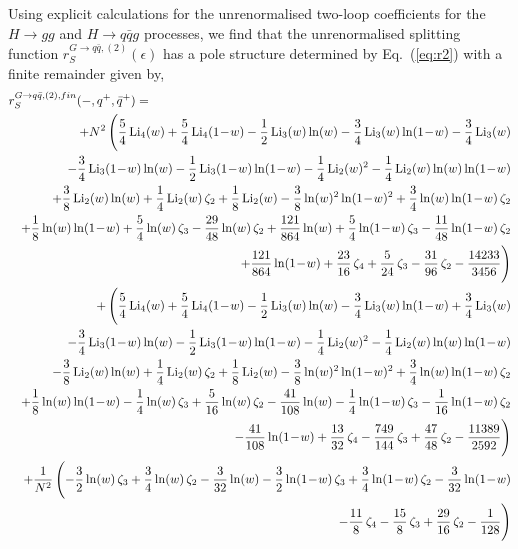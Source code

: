 \documentclass[paper,notoc,nohyper]{JHEP3}
\def\e{\epsilon}
\def\lx{\ln(w)}
\def\ly{\ln(1\!-\!w)}
\def\Libx{{\rm Li}_2(w)}
\def\Licx{{\rm Li}_3(w)}
\def\Lidx{{\rm Li}_4(w)}
\def\Licy{{\rm Li}_3(1\!-\!w)}
\def\Lidy{{\rm Li}_4(1\!-\!w)}
\def\e{\epsilon}
\begin{document}
Using explicit calculations for the unrenormalised two-loop coefficients for the $H \to gg$ and
$H \to q\bar q g$ processes, 
we find that the unrenormalised splitting function $r_{S}^{G \to q\bar q,(2)}(\e)$ has 
a pole structure determined by
Eq.~(\ref{eq:r2}) with a finite remainder given by,
\begin{eqnarray}
\label{eq:r2qqpp}
\lefteqn{r_{S}^{G \to q\bar q,(2),fin}(-,q^{+},\bar{q}^{+})=}\nonumber \\&&
+{N^2}\,\Biggl ({5\over 4}\,{\Lidx}+{5\over 4}\,{\Lidy}-{1\over 2}\,{\Licx}\,{\lx}-{3\over 4}\,{\Licx}\,{\ly}-{3\over 4}\,{\Licx}\nonumber \\&&
-{3\over 4}\,{\Licy}\,{\lx}-{1\over 2}\,{\Licy}\,{\ly}-{1\over 4}\,{\Libx^2}-{1\over 4}\,{\Libx}\,{\lx}\,{\ly}\nonumber \\&&
+{3\over 8}\,{\Libx}\,{\lx}+{1\over 4}\,{\Libx}\,{\zeta_2}+{1\over 8}\,{\Libx}-{3\over 8}\,{\lx^2}\,{\ly^2}+{3\over 4}\,{\lx}\,{\ly}\,{\zeta_2}\nonumber \\&&
+{1\over 8}\,{\lx}\,{\ly}+{5\over 4}\,{\lx}\,{\zeta_3}-{29\over 48}\,{\lx}\,{\zeta_2}+{121\over 864}\,{\lx}+{5\over 4}\,{\ly}\,{\zeta_3}-{11\over 48}\,{\ly}\,{\zeta_2}\nonumber \\&&
+{121\over 864}\,{\ly}+{23\over 16}\,{\zeta_4}+{5\over 24}\,{\zeta_3}-{31\over 96}\,{\zeta_2}-{14233\over 3456}\Biggr )\nonumber \\&&
+\,\Biggl ({5\over 4}\,{\Lidx}+{5\over 4}\,{\Lidy}-{1\over 2}\,{\Licx}\,{\lx}-{3\over 4}\,{\Licx}\,{\ly}+{3\over 4}\,{\Licx}\nonumber \\&&
-{3\over 4}\,{\Licy}\,{\lx}-{1\over 2}\,{\Licy}\,{\ly}-{1\over 4}\,{\Libx^2}-{1\over 4}\,{\Libx}\,{\lx}\,{\ly}\nonumber \\&&
-{3\over 8}\,{\Libx}\,{\lx}+{1\over 4}\,{\Libx}\,{\zeta_2}+{1\over 8}\,{\Libx}-{3\over 8}\,{\lx^2}\,{\ly^2}+{3\over 4}\,{\lx}\,{\ly}\,{\zeta_2}\nonumber \\&&
+{1\over 8}\,{\lx}\,{\ly}-{1\over 4}\,{\lx}\,{\zeta_3}+{5\over 16}\,{\lx}\,{\zeta_2}-{41\over 108}\,{\lx}-{1\over 4}\,{\ly}\,{\zeta_3}-{1\over 16}\,{\ly}\,{\zeta_2}\nonumber \\&&
-{41\over 108}\,{\ly}+{13\over 32}\,{\zeta_4}-{749\over 144}\,{\zeta_3}+{47\over 48}\,{\zeta_2}-{11389\over 2592}\Biggr)\nonumber \\&&
+{1\over N^2}\,\Biggl (-{3\over 2}\,{\lx}\,{\zeta_3}+{3\over 4}\,{\lx}\,{\zeta_2}-{3\over 32}\,{\lx}-{3\over 2}\,{\ly}\,{\zeta_3}+{3\over 4}\,{\ly}\,{\zeta_2}-{3\over 32}\,{\ly}\nonumber \\&&
-{11\over 8}\,{\zeta_4}-{15\over 8}\,{\zeta_3}+{29\over 16}\,{\zeta_2}-{1\over 128}\Biggr )\nonumber \\&&

\end{eqnarray}
\end{document}
